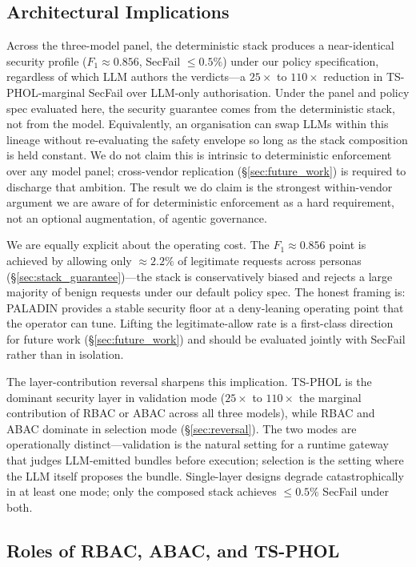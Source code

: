 \documentclass[10pt,a4paper,twocolumn]{article}
\begin{document}
\subsection{Architectural Implications}
\label{sec:arch_implications}

Across the three-model panel, the deterministic stack produces a near-identical security profile ($F_1 \approx 0.856$, SecFail $\leq 0.5\%$) under our policy specification, regardless of which LLM authors the verdicts---a $25\times$ to $110\times$ reduction in TS-PHOL-marginal SecFail over LLM-only authorisation. Under the panel and policy spec evaluated here, the security guarantee comes from the deterministic stack, not from the model. Equivalently, an organisation can swap LLMs within this lineage without re-evaluating the safety envelope so long as the stack composition is held constant. We do not claim this is intrinsic to deterministic enforcement over any model panel; cross-vendor replication (\S\ref{sec:future_work}) is required to discharge that ambition. The result we do claim is the strongest within-vendor argument we are aware of for deterministic enforcement as a hard requirement, not an optional augmentation, of agentic governance.

We are equally explicit about the operating cost. The $F_1 \approx 0.856$ point is achieved by allowing only $\approx 2.2\%$ of legitimate requests across personas (\S\ref{sec:stack_guarantee})---the stack is conservatively biased and rejects a large majority of benign requests under our default policy spec. The honest framing is: PALADIN provides a stable security floor at a deny-leaning operating point that the operator can tune. Lifting the legitimate-allow rate is a first-class direction for future work (\S\ref{sec:future_work}) and should be evaluated jointly with SecFail rather than in isolation.

The layer-contribution reversal sharpens this implication. TS-PHOL is the dominant security layer in validation mode ($25\times$ to $110\times$ the marginal contribution of RBAC or ABAC across all three models), while RBAC and ABAC dominate in selection mode (\S\ref{sec:reversal}). The two modes are operationally distinct---validation is the natural setting for a runtime gateway that judges LLM-emitted bundles before execution; selection is the setting where the LLM itself proposes the bundle. Single-layer designs degrade catastrophically in at least one mode; only the composed stack achieves $\leq 0.5\%$ SecFail under both.

\subsection{Roles of RBAC, ABAC, and TS-PHOL}
\label{sec:layer_roles}
\end{document}

